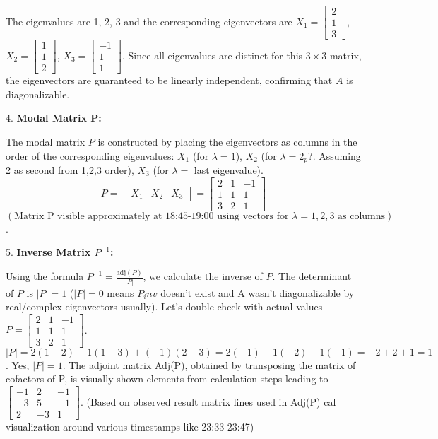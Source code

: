 \documentclass{article}
\begin{document}
    The eigenvalues are 1, 2, 3 and the corresponding eigenvectors are $X_1 = \begin{bmatrix} 2 \\ 1 \\ 3 \end{bmatrix}$, $X_2 = \begin{bmatrix} 1 \\ 1 \\ 2 \end{bmatrix}$, $X_3 = \begin{bmatrix} -1 \\ 1 \\ 1 \end{bmatrix}$. Since all eigenvalues are distinct for this $3 \times 3$ matrix, the eigenvectors are guaranteed to be linearly independent, confirming that $A$ is diagonalizable.

4.  \textbf{Modal Matrix P:}

    The modal matrix $P$ is constructed by placing the eigenvectors as columns in the order of the corresponding eigenvalues: $X_1$ (for $\lambda=1$), $X_2$ (for $\lambda=2_p{?}$. Assuming 2 as second from 1,2,3 order), $X_3$ (for $\lambda=$ last eigenvalue).
    \[ P = \begin{bmatrix} X_1 & X_2 & X_3 \end{bmatrix} = \begin{bmatrix} 2 & 1 & -1 \\ 1 & 1 & 1 \\ 3 & 2 & 1 \end{bmatrix} \]
    $( \text{Matrix P visible approximately at 18:45-19:00 using vectors for } \lambda=1, 2, 3 \text{ as columns})$.

5.  \textbf{Inverse Matrix $P^{-1}$:}

    Using the formula $P^{-1} = \frac{\text{adj}(P)}{|P|}$, we calculate the inverse of $P$.
    The determinant of $P$ is $|P| = 1$ ($|P|=0$ means $P_inv$ doesn't exist and A wasn't diagonalizable by real/complex eigenvectors usually). Let's double-check with actual values $P = \begin{bmatrix} 2 & 1 & -1 \\ 1 & 1 & 1 \\ 3 & 2 & 1 \end{bmatrix}$. $|P| = 2(1-2) - 1(1-3) + (-1)(2-3) = 2(-1) - 1(-2) -1(-1) = -2+2+1=1$. Yes, $|P|=1$.
    The adjoint matrix Adj(P), obtained by transposing the matrix of cofactors of P, is visually shown elements from calculation steps leading to $\begin{bmatrix} -1 & 2 & -1 \\ -3 & 5 & -1 \\ 2 & -3 & 1 \end{bmatrix}$. (Based on observed result matrix lines used in Adj(P) cal visualization around various timestamps like 23:33-23:47)
\end{document}
